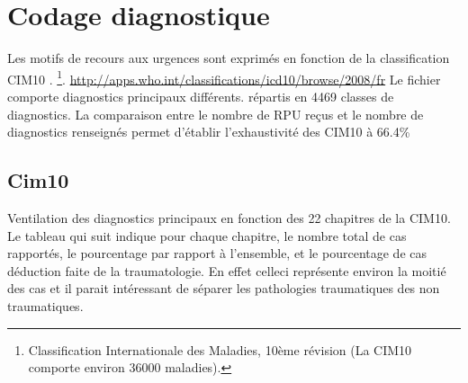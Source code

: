 \documentclass[12pt,english,french,twoside]{report}\usepackage[]{graphicx}\usepackage[]{color}
\begin{document}
\newpage
\chapter{Codage diagnostique}

%




Les motifs de recours aux urgences sont exprimés en fonction de la classification CIM10 \cite{10}.
\footnote{Classification Internationale des Maladies, 10ème révision (La CIM10 comporte environ 36000 maladies).}.
\url{http://apps.who.int/classifications/icd10/browse/2008/fr}
Le fichier comporte  diagnostics principaux différents.
répartis en 4469 classes de diagnostics.
La comparaison entre le nombre de RPU reçus et le nombre de diagnostics renseignés permet d'établir l'exhaustivité des CIM10 à 66.4\% 


\section{Cim10}

Ventilation des diagnostics principaux en fonction des 22 chapitres de la CIM10. Le tableau qui suit indique pour chaque chapitre, le nombre total de cas rapportés, le pourcentage par rapport à l'ensemble, et le pourcentage de cas déduction faite de la traumatologie. En effet celleci représente environ la moitié des cas et il parait intéressant de séparer les pathologies traumatiques des non traumatiques.





\end{document}
